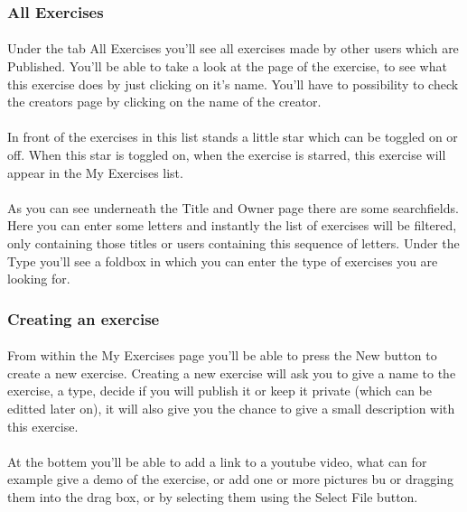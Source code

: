 \documentclass[11pt,a4paper]{scrartcl}
\begin{document}
\subsubsection{All Exercises}
\paragraph{}Under the tab All Exercises you'll see all exercises made by other users which are Published. You'll be able to take a look at the page of the exercise, to see what this exercise does by just clicking on it's name. You'll have to possibility to check the creators page by clicking on the name of the creator.
\paragraph{}In front of the exercises in this list stands a little star which can be toggled on or off. When this star is toggled on, when the exercise is starred, this exercise will appear in the My Exercises list.
\paragraph{}As you can see underneath the Title and Owner page there are some searchfields. Here you can enter some letters and instantly the list of exercises will be filtered, only containing those titles or users containing this sequence of letters. Under the Type you'll see a foldbox in which you can enter the type of exercises you are looking for.

\subsubsection{Creating an exercise}
\paragraph{}From within the My Exercises page you'll be able to press the New button to create a new exercise. Creating a new exercise will ask you to give a name to the exercise, a type, decide if you will publish it or keep it private (which can be editted later on), it will also give you the chance to give a small description with this exercise.
\paragraph{}At the bottem you'll be able to add a link to a youtube video, what can for example give a demo of the exercise, or add one or more pictures bu or dragging them into the drag box, or by selecting them using the Select File button. 
\end{document}
